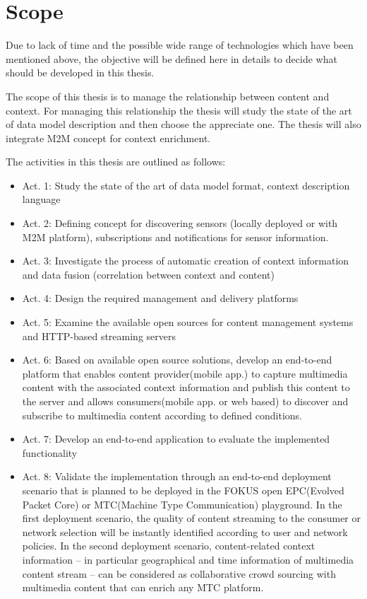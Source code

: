 \section{Scope\label{sec:scope}}

Due to lack of time and the possible wide range of technologies which have been mentioned above, the objective will be defined here in details to decide what should be developed in this thesis.

The scope of this thesis is to manage the relationship between content and context. For managing this relationship the thesis will study the state of the art of data model description and then choose the appreciate one. The thesis will also integrate M2M concept for context enrichment.


The activities in this thesis are outlined as follows:
	\begin{itemize}
		\item Act. 1: Study the state of the art of data model format, context description language
				\vspace{-0.1in} 
		\item Act. 2: Defining concept for discovering sensors (locally deployed or with M2M platform), subscriptions and notifications for sensor information.
				\vspace{-0.1in} 
		\item Act. 3: Investigate the process of automatic creation of context information and data fusion (correlation between context and content)
				\vspace{-0.1in} 		
		\item Act. 4: Design the required management and delivery platforms 
    			\vspace{-0.1in} 
		\item Act. 5: Examine the available open sources for content management systems and HTTP-based streaming servers
 				\vspace{-0.1in} 
		\item Act. 6: Based on available open source solutions, develop an end-to-end platform that enables content provider(mobile app.) to capture multimedia content with the associated context information and publish this content to the server and allows consumers(mobile app. or web based) to discover and subscribe to multimedia content according to defined conditions. 
    			\vspace{-0.1in} 
    	\item Act. 7: Develop an end-to-end application to evaluate the implemented functionality
		\item Act. 8: Validate the implementation through an end-to-end deployment scenario that is planned to be deployed in the FOKUS open EPC(Evolved Packet Core) or MTC(Machine Type Communication) playground. In the first deployment scenario, the quality of content streaming to the consumer or network selection will be instantly identified according to user and network policies. In the second deployment scenario, content-related context information – in particular geographical and time information of multimedia content stream – can be considered as collaborative crowd sourcing with multimedia content that can enrich any MTC platform.
    \end{itemize}

